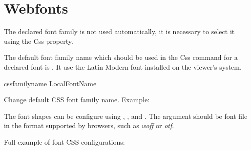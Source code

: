 \section{Webfonts}
\label{sec:webfonts}


The declared font family is not used automatically, it is necessary to select
it using the  Css property.

The default font family name which should be used in the Css
 command for a declared font is . 
It use the Latin Modern font installed on the viewer's system. 

 {cssfamilyname} {LocalFontName}\EndDoc

Change default CSS font family name. Example:

\begin{texsource}
\end{texsource}

The font shapes can be configure using , 
,  and
. The argument should be font file in the format
supported by browsers, such as \textit{woff} or \textit{otf}.

Full example of font CSS configurations:

\begin{texsource}
\end{texsource}
